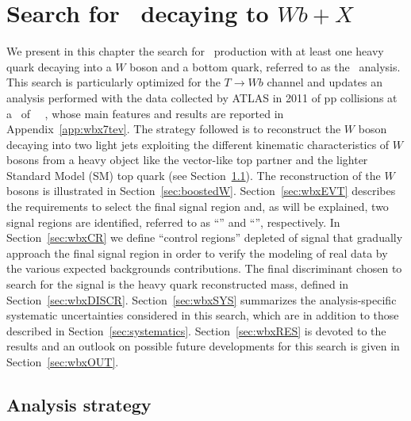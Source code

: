 \clearpage{\pagestyle{empty}\cleardoublepage}

\chapter{Search for \TTbar\ decaying to $Wb+X$}\label{chap:wbx}

We present in this chapter the search for \TTbar\ production with
at least one heavy quark decaying into a $W$ boson and a bottom
quark, referred to as the \wbx\ analysis.
This search is particularly optimized for the $T\to Wb$ channel
and updates an analysis performed with the data collected
by ATLAS in 2011 of pp collisions at a \cme\ of ~\tev~\cite{ATLAS:2012qe},
whose main features and results are reported in Appendix~\ref{app:wbx7tev}.
The strategy followed is to reconstruct the $W$ boson decaying
into two light jets exploiting the different kinematic characteristics
of $W$ bosons from a heavy object like the vector-like top partner
and the lighter Standard Model (SM) top quark (see Section~\ref{sec:wbxSTRAT}).
The reconstruction of the $W$ bosons is illustrated in
Section~\ref{sec:boostedW}.
Section~\ref{sec:wbxEVT} describes the requirements to select the
final signal region and, as will be explained, two signal regions are identified, 
referred to as ``\loose'' and ``\tight'', respectively.
In Section~\ref{sec:wbxCR} we define ``control regions'' depleted of
signal that gradually approach the final signal region in order to 
verify the modeling of real data by the various expected
backgrounds contributions. 
The final discriminant chosen to search for the signal is
the heavy quark reconstructed mass, defined in Section~\ref{sec:wbxDISCR}.
Section~\ref{sec:wbxSYS} summarizes the analysis-specific 
systematic uncertainties considered in this search, which are in addition to
those described in Section~\ref{sec:systematics}.
Section~\ref{sec:wbxRES} is devoted to the results
and an outlook on possible future developments for this search is given
in Section~\ref{sec:wbxOUT}.

\section{Analysis strategy}\label{sec:wbxSTRAT}

